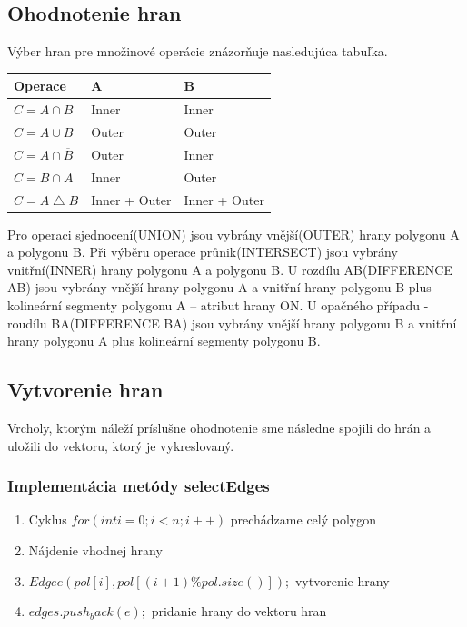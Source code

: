 \documentclass[12pt]{article}
\begin{document}
\subsection {Ohodnotenie hran}
Výber hran pre množinové operácie znázorňuje nasledujúca tabuľka.

\begin{table}[h]
	\begin{tabular}{|l|l|l|}
		\hline
		Operace & A             & B             \\ \hline \hline
		$C = A\cap B$  & Inner         & Inner         \\ \hline
		$C = A\cup B$  & Outer         & Outer         \\ \hline
		$C = A\cap \overline{B}$  & Outer         & Inner         \\ \hline
		$C = B\cap \overline{A}$  & Inner         & Outer         \\ \hline
		$C = A\bigtriangleup B$  & Inner + Outer & Inner + Outer \\ \hline
	\end{tabular}
\end{table}

Pro operaci sjednocení(UNION) jsou vybrány vnější(OUTER) hrany polygonu A a polygonu B. Při výběru operace průnik(INTERSECT) jsou vybrány vnitřní(INNER) hrany polygonu A a polygonu B. U rozdílu AB(DIFFERENCE AB) jsou vybrány vnější hrany polygonu A a vnitřní hrany polygonu B plus kolineární segmenty polygonu A -- atribut hrany ON. U opačného případu - roudílu BA(DIFFERENCE BA) jsou vybrány vnější hrany polygonu B a vnitřní hrany polygonu A plus kolineární segmenty polygonu B.

\subsection {Vytvorenie hran}
Vrcholy, ktorým náleží príslušne ohodnotenie sme následne spojili do hrán a uložili do vektoru, ktorý je vykreslovaný.

\subsubsection{Implementácia metódy selectEdges}
\begin{enumerate}
\item Cyklus $ for(int i = 0; i < n; i++)$  prechádzame celý polygon
\item Nájdenie vhodnej hrany
\item \hspace {1.0cm} $Edge e (pol[i], pol[(i+1)\%pol.size()]);$ vytvorenie hrany
\item \hspace {1.0cm} $edges.push_back(e);$ pridanie hrany do vektoru hran
\end{enumerate}
\end{document}

